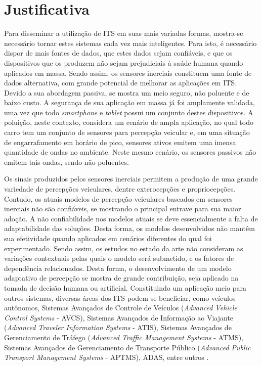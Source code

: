 \section{Justificativa}

Para disseminar a utilização de ITS em suas mais variadas formas, mostra-se necessário tornar estes sistemas cada vez mais inteligentes. Para isto, é necessário dispor de mais fontes de dados, que estes dados sejam confiáveis, e que os dispositivos que os produzem não sejam prejudiciais à saúde humana quando aplicados em massa. Sendo assim, os sensores inerciais constituem uma fonte de dados alternativa, com grande potencial de melhorar as aplicações em ITS. Devido a sua abordagem passiva, se mostra um meio seguro, não poluente e de baixo custo. A segurança de sua aplicação em massa já foi amplamente validada, uma vez que todo \textit{smartphone} e \textit{tablet} possui um conjunto destes dispositivos. A poluição, neste contexto, considera um cenário de ampla aplicação, no qual todo carro tem um conjunto de sensores para percepção veicular e, em uma situação de engarrafamento em horário de pico, sensores ativos emitem uma imensa quantidade de ondas no ambiente. Neste mesmo cenário, os sensores passivos não emitem tais ondas, sendo não poluentes. 

Os sinais produzidos pelos sensores inerciais permitem a produção de uma grande variedade de percepções veiculares, dentre exterocepções e propriocepções. Contudo, os atuais modelos de percepção veiculares baseados em sensores inerciais não são confiáveis, se mostrando o principal entrave para sua maior adoção. A não confiabilidade nos modelos atuais se deve essencialmente a falta de adaptabilidade das soluções. Desta forma, os modelos desenvolvidos não mantêm sua efetividade quando aplicados em cenários diferentes do qual foi experimentado. Sendo assim, os estudos no estado da arte não consideram as variações contextuais pelas quais o modelo será submetido, e os fatores de dependência relacionados. Desta forma, o desenvolvimento de um modelo adaptativo de percepção se mostra de grande contribuição, seja aplicado na tomada de decisão humana ou artificial. Constituindo um aplicação meio para outros sistemas, diversas áreas dos ITS podem se beneficiar, como veículos autônomos, Sistemas Avançados de Controle de Veículos (\textit{Advanced Vehicle Control Systems} - AVCS), Sistemas Avançados de Informação ao Viajante (\textit{Advanced Traveler Information Systems} - ATIS), Sistemas Avançados de Gerenciamento de Tráfego (\textit{Advanced Traffic Management Systems} - ATMS), Sistemas Avançados de Gerenciamento de Transporte Público (\textit{Advanced Public Transport Management Systems} - APTMS), ADAS, entre outros \cite{Zhang2011,Singh2015}.

